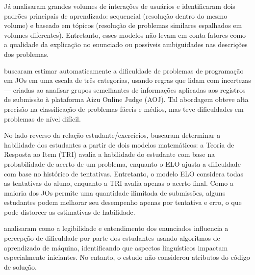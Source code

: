 \documentclass[12pt]{article}
\begin{document}
Já \cite{zhao2018} analisaram grandes volumes de interações de usuários e identificaram dois padrões principais de aprendizado: sequencial (resolução dentro do mesmo volume) e baseado em tópicos (resolução de problemas similares espalhados em volumes diferentes). Entretanto, esses modelos não levam em conta fatores como a qualidade da explicação no enunciado ou possíveis ambiguidades nas descrições dos problemas.

\cite{watanobe2018} buscaram estimar automaticamente a dificuldade de problemas de programação em JOs em uma escala de três categorias, usando regras que lidam com incertezas --- criadas ao analisar grupos semelhantes de informações aplicadas aos registros de submissão à plataforma Aizu Online Judge (AOJ). Tal abordagem obteve alta precisão na classificação de problemas fáceis e médios, mas teve dificuldades em problemas de nível difícil.

No lado reverso da relação estudante/exercícios, \cite{zaffalon2019} buscaram determinar a habilidade dos estudantes a partir de dois modelos matemáticos: a Teoria de Resposta ao Item (TRI) avalia a habilidade do estudante com base na probabilidade de acerto de um problema, enquanto o ELO ajusta a dificuldade com base no histórico de tentativas. Entretanto, o modelo ELO considera todas as tentativas do aluno, enquanto a TRI avalia apenas o acerto final. Como a maioria dos JOs permite uma quantidade ilimitada de submissões, alguns estudantes podem melhorar seu desempenho apenas por tentativa e erro, o que pode distorcer as estimativas de habilidade.

\cite{santos2019} analisaram como a legibilidade e entendimento dos enunciados influencia a percepção de dificuldade por parte dos estudantes usando algoritmos de aprendizado de máquina, identificando que aspectos linguísticos impactam especialmente iniciantes. No entanto, o estudo não considerou atributos do código de solução.
\end{document}
